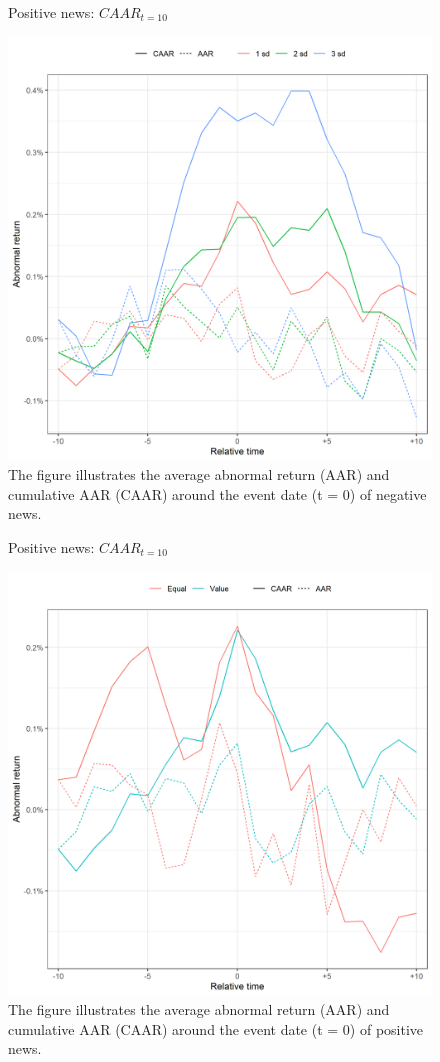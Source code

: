 \begin{figure} [H]
    \centering
    \caption{Positive news: $CAAR_{t=10}$}
    \includegraphics[scale=0.6]{Projekt/1.Figures analysis/ST_positive_sensitivity.png}
     \caption*{\footnotesize The figure illustrates the average abnormal return (AAR) and cumulative AAR (CAAR) around the event date (t = 0) of negative news. }
    \label{fig:ST_pos_sensi}
\end{figure} 

\begin{figure} [H]
    \centering
    \caption{Positive news: $CAAR_{t=10}$}
    \includegraphics[scale=0.6]{Projekt/1.Figures analysis/ST_positive_sensitivity_weight.png}
     \caption*{\footnotesize The figure illustrates the average abnormal return (AAR) and cumulative AAR (CAAR) around the event date (t = 0) of positive news. }
    \label{fig:ST_pos_sensi}
\end{figure} 